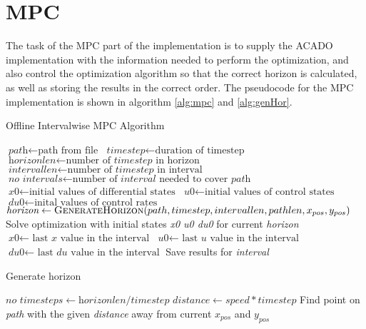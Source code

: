 \section{MPC}

The task of the MPC part of the implementation is to supply the ACADO implementation with the information needed to perform the optimization, and also control the optimization algorithm so that the correct horizon is calculated, as well as storing the results in the correct order. The pseudocode for the MPC implementation is shown in algorithm \ref{alg:mpc} and \ref{alg:genHor}.

\begin{algorithm}
\caption{Offline Intervalwise MPC Algorithm}
\label{alg:mpc}
\begin{algorithmic}
	\State $\textit{path} \gets \text{path from file}$
	\State $\textit{timestep} \gets \text{duration of timestep}$
	\State $\textit{horizonlen} \gets \text{number of } \textit{timestep} \text{ in horizon}$
	\State $\textit{intervallen} \gets \text{number of } \textit{timestep} \text{ in interval}$
	\State $\textit{no intervals} \gets \text{number of } \textit{interval} \text{ needed to cover } \textit{path}$
	\State $\textit{x0} \gets \text{initial values of differential states}$
	\State $\textit{u0} \gets \text{initial values of control states}$
	\State $\textit{du0} \gets \text{inital values of control rates}$
		\State $\textit{horizon} \gets \Call{GenerateHorizon}{path, timestep, intervallen, pathlen, x_{pos}, y_{pos}}$
		\State Solve optimization with initial states \textit{x0 u0 du0} for current \textit{horizon}
		\State $\textit{x0} \gets \text{ last } \textit{x} \text{ value in the interval}$
		\State $\textit{u0} \gets \text{ last } \textit{u} \text{ value in the interval}$
		\State $\textit{du0} \gets \text{ last } \textit{du} \text{ value in the interval}$
		\State Save results for \textit{interval}
	\EndFor
\EndProcedure
\end{algorithmic}
\end{algorithm}

\begin{algorithm}
\caption{Generate horizon}
\label{alg:genHor}
\begin{algorithmic}
	\State $\textit{no timesteps} \gets \textit{horizonlen}/\textit{timestep}$
	\State $\textit{distance} \gets \textit{speed} * \textit{timestep}$
		\State Find point on \textit{path} with the given \textit{distance} away from current \textit{$x_{pos}$} and \textit{$y_{pos}$}
	\EndFor
\EndProcedure
\end{algorithmic}
\end{algorithm}


